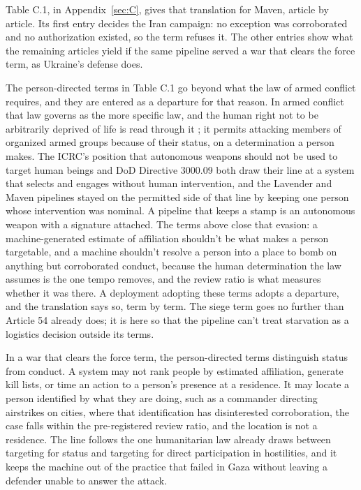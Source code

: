 Table C.1, in Appendix~\ref{sec:C}, gives that translation for Maven, article by article. Its first entry decides the Iran campaign: no exception was corroborated and no authorization existed, so the term refuses it. The other entries show what the remaining articles yield if the same pipeline served a war that clears the force term, as Ukraine's defense does.

The person-directed terms in Table C.1 go beyond what the law of armed conflict requires, and they are entered as a departure for that reason. In armed conflict that law governs as the more specific law, and the human right not to be arbitrarily deprived of life is read through it \autocite[para.~25]{icj1996nuclear}; it permits attacking members of organized armed groups because of their status, on a determination a person makes. The ICRC's position that autonomous weapons should not be used to target human beings \autocite{icrc2021aws} and DoD Directive 3000.09 both draw their line at a system that selects and engages without human intervention, and the Lavender and Maven pipelines stayed on the permitted side of that line by keeping one person whose intervention was nominal. A pipeline that keeps a stamp is an autonomous weapon with a signature attached. The terms above close that evasion: a machine-generated estimate of affiliation shouldn't be what makes a person targetable, and a machine shouldn't resolve a person into a place to bomb on anything but corroborated conduct, because the human determination the law assumes is the one tempo removes, and the review ratio is what measures whether it was there. A deployment adopting these terms adopts a departure, and the translation says so, term by term. The siege term goes no further than Article 54 already does; it is here so that the pipeline can't treat starvation as a logistics decision outside its terms.

In a war that clears the force term, the person-directed terms distinguish status from conduct. A system may not rank people by estimated affiliation, generate kill lists, or time an action to a person's presence at a residence. It may locate a person identified by what they are doing, such as a commander directing airstrikes on cities, where that identification has disinterested corroboration, the case falls within the pre-registered review ratio, and the location is not a residence. The line follows the one humanitarian law already draws between targeting for status and targeting for direct participation in hostilities, and it keeps the machine out of the practice that failed in Gaza without leaving a defender unable to answer the attack.

